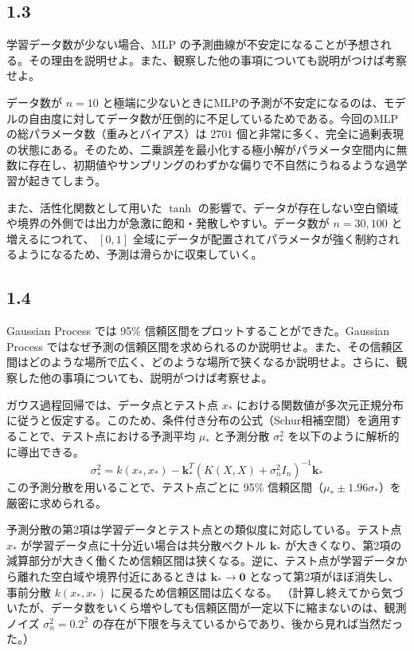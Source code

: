 \documentclass[11pt,a4paper,dvipdfmx]{article}
\numberwithin{equation}{section}
\newenvironment{proofbox}[0]
{
    \begin{mdframed}[
        linecolor=black,
        topline=false,
        bottomline=false,
        rightline=false,
        leftline=true,
        linewidth=2pt,
        innerleftmargin=10pt,
        skipabove=\baselineskip,
        skipbelow=\baselineskip,
    ]
}
{
    \end{mdframed}
}
\newenvironment{note}[0]
{
    \begin{tcolorbox}[sharp corners, colframe=gray!20, colback=gray!20, width=\textwidth]
}
{
    \end{tcolorbox}
}
\begin{document}
\subsection*{1.3}
\begin{note}
学習データ数が少ない場合、MLP の予測曲線が不安定になることが予想される。その理由を説明せよ。また、観察した他の事項についても説明がつけば考察せよ。
\end{note}
\begin{proofbox}
データ数が $n=10$ と極端に少ないときにMLPの予測が不安定になるのは、モデルの自由度に対してデータ数が圧倒的に不足しているためである。今回のMLPの総パラメータ数（重みとバイアス）は $2701$ 個と非常に多く、完全に過剰表現の状態にある。そのため、二乗誤差を最小化する極小解がパラメータ空間内に無数に存在し、初期値やサンプリングのわずかな偏りで不自然にうねるような過学習が起きてしまう。

また、活性化関数として用いた $\tanh$ の影響で、データが存在しない空白領域や境界の外側では出力が急激に飽和・発散しやすい。データ数が $n=30, 100$ と増えるにつれて、 $[0, 1]$ 全域にデータが配置されてパラメータが強く制約されるようになるため、予測は滑らかに収束していく。
\end{proofbox}

\subsection*{1.4}
\begin{note}
Gaussian Process では 95\% 信頼区間をプロットすることができた。Gaussian Process ではなぜ予測の信頼区間を求められるのか説明せよ。また、その信頼区間はどのような場所で広く、どのような場所で狭くなるか説明せよ。さらに、観察した他の事項についても、説明がつけば考察せよ。
\end{note}
\begin{proofbox}
ガウス過程回帰では、データ点とテスト点 $x_*$ における関数値が多次元正規分布に従うと仮定する。このため、条件付き分布の公式（Schur相補空間）を適用することで、テスト点における予測平均 $\mu_*$ と予測分散 $\sigma_*^2$ を以下のように解析的に導出できる。
\[
\sigma^2_* = k(x_*, x_*) - \bm{k}_*^T (K(X, X) + \sigma_n^2 I_n)^{-1} \bm{k}_*
\]
この予測分散を用いることで、テスト点ごとに 95\% 信頼区間（$\mu_* \pm 1.96\sigma_*$）を厳密に求められる。

予測分散の第2項は学習データとテスト点との類似度に対応している。テスト点 $x_*$ が学習データ点に十分近い場合は共分散ベクトル $\bm{k}_*$ が大きくなり、第2項の減算部分が大きく働くため信頼区間は狭くなる。逆に、テスト点が学習データから離れた空白域や境界付近にあるときは $\bm{k}_* \to \bm{0}$ となって第2項がほぼ消失し、事前分散 $k(x_*, x_*)$ に戻るため信頼区間は広くなる。
（計算し終えてから気づいたが、データ数をいくら増やしても信頼区間が一定以下に縮まないのは、観測ノイズ $\sigma_n^2 = 0.2^2$ の存在が下限を与えているからであり、後から見れば当然だった。）
\end{proofbox}
\end{document}
